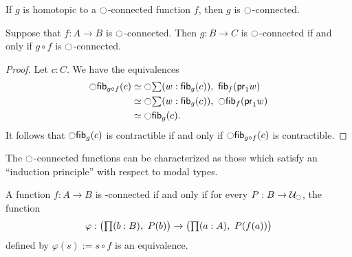 \begin{cor}
If $g$ is homotopic to a $\ocircle$-connected function $f$, then $g$ is $\ocircle$-connected.
\end{cor}

\begin{lem}\label{lem:nconnected_postcomp}
Suppose that $f:A\to B$ is $\ocircle$-connected. Then $g:B\to C$ is $\ocircle$-connected if and only if $g\circ f$ is
$\ocircle$-connected.
\end{lem}

\begin{proof}
Let $c:C$. We have the equivalences
\begin{align*}
\modal\hfib{g\circ f}c& \simeq \modal \sm{w:\hfib{g}c}\hfib{f}{\proj1 w}\\
& \simeq \modal\sm{w:\hfib{g}c}\modal\hfib{f}{\proj1 w}\\
& \simeq \modal\hfib{g}c.
\end{align*}
It follows that $\ocircle{\mathsf{fib}}_{g}(c)$ is contractible if and only if $\ocircle{\mathsf{fib}}_{g\circ f}(c)$ is
contractible.
\end{proof}

The $\ocircle$-connected functions can be characterized as those which satisfy an ``induction principle'' with respect to modal types.

\begin{lem}\label{prop:nconnected_tested_by_lv_n_dependent types}
A function $f:A\to B$ is \modal-connected if and only if for every $P:B\to\mathcal{U}_{\ocircle}$, the function
\begin{equation*}
\varphi :\big(\prd{b:B} P(b)\big)\to\big(\prd{a:A}P(f(a))\big)
\end{equation*}
defined by $\varphi(s):=s\circ f$ is an equivalence.
\end{lem}

